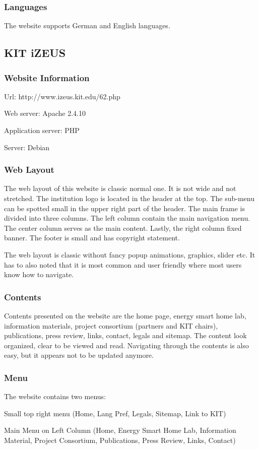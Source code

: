 \subsubsection*{Languages}
The website supports German and English languages.

\subsection{KIT iZEUS}
\subsubsection*{Website Information}
\begin{itemize*}
\item Url: http://www.izeus.kit.edu/62.php
\item Web server: Apache 2.4.10
\item Application server: PHP
\item Server: Debian
\end{itemize*}

\subsubsection*{Web Layout}
The web layout of this website \cite{Multin.2012} is classic normal one. It is not wide and not stretched. The institution logo is located in the header at the top. The sub-menu can be spotted small in the upper right part of the header. The main frame is divided into three columns. The left column contain the main navigation menu. The center column serves as the main content. Lastly, the right column fixed banner. The footer is small and has copyright statement.

The web layout is classic without fancy popup animations, graphics, slider etc. It has to also noted that it is most common and user friendly where most users know how to navigate.

\subsubsection*{Contents}
Contents presented on the website are the home page, energy smart home lab, information materials, project consortium (partners and KIT chairs), publications, press review, links, contact, legals and sitemap. The content look organized, clear to be viewed and read. Navigating through the contents is also easy, but it appears not to be updated anymore.

\subsubsection*{Menu}
The website contains two menus:
\begin{itemize*}
\item Small top right menu (Home, Lang Pref, Legals, Sitemap, Link to KIT)
\item Main Menu on Left Column (Home, Energy Smart Home Lab, Information Material, Project Consortium, Publications, Press Review, Links, Contact)
\end{itemize*}

